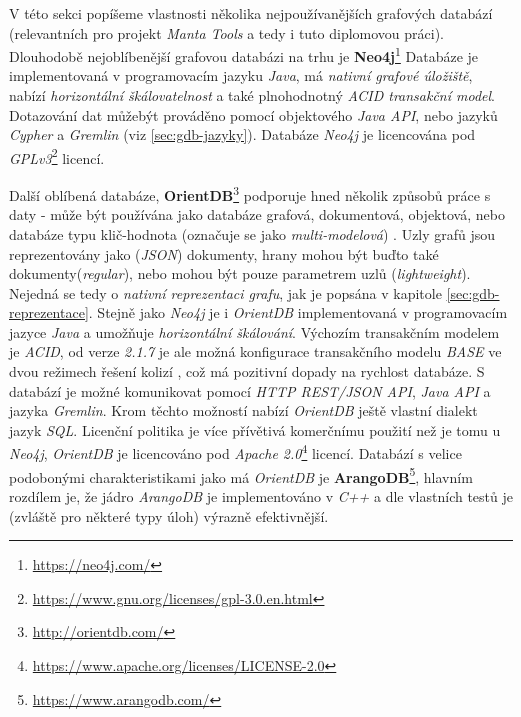 V této sekci popíšeme vlastnosti několika nejpoužívanějších grafových databází (relevantních pro projekt \textit{Manta Tools} a tedy i tuto diplomovou práci). Dlouhodobě nejoblíbenější grafovou databázi na trhu \cite{Ranking17} je \textbf{Neo4j}\footnote{\url{https://neo4j.com/}} Databáze je implementovaná v programovacím jazyku \textit{Java}, má \textit{nativní grafové úložiště}, nabízí \textit{horizontální škálovatelnost} a také plnohodnotný \textit{ACID transakční model}. Dotazování dat můžebýt prováděno pomocí objektového \textit{Java API}, nebo jazyků \textit{Cypher} a \textit{Gremlin} (viz \ref{sec:gdb-jazyky}).
Databáze \textit{Neo4j} je licencována pod \textit{GPLv3}\footnote{\url{https://www.gnu.org/licenses/gpl-3.0.en.html}} licencí.

Další oblíbená databáze, \textbf{OrientDB}\footnote{\url{http://orientdb.com/}} podporuje hned několik způsobů práce s daty - může být používána jako databáze grafová, dokumentová, objektová, nebo databáze typu klič-hodnota (označuje se jako \textit{multi-modelová}) \cite{OrientMultiModel}. Uzly grafů jsou reprezentovány jako (\textit{JSON}) dokumenty, hrany mohou být buďto také dokumenty(\textit{regular}), nebo mohou být pouze parametrem uzlů (\textit{lightweight}). Nejedná se tedy o \textit{nativní reprezentaci grafu}, jak je popsána v kapitole \ref{sec:gdb-reprezentace}.
Stejně jako \textit{Neo4j} je i \textit{OrientDB} implementovaná v programovacím jazyce \textit{Java} a umožňuje \textit{horizontální škálování}. Výchozím transakčním modelem je \textit{ACID}, od verze \textit{2.1.7} je ale možná konfigurace transakčního modelu \textit{BASE} ve dvou režimech řešení kolizí \cite{OrientConsistency}, což má pozitivní dopady na rychlost databáze. S databází je možné komunikovat pomocí \textit{HTTP REST/JSON API}, \textit{Java API} a jazyka \textit{Gremlin}. Krom těchto možností nabízí \textit{OrientDB} ještě vlastní dialekt jazyk \textit{SQL}. Licenční politika je více přívětivá komerčnímu použití než je tomu u \textit{Neo4j}, \textit{OrientDB} je licencováno pod \textit{Apache 2.0}\footnote{\url{https://www.apache.org/licenses/LICENSE-2.0}} licencí.
Databází s velice podobonými charakteristikami jako má \textit{OrientDB} je \textbf{ArangoDB}\footnote{\url{https://www.arangodb.com/}}, hlavním rozdílem je, že jádro \textit{ArangoDB} je implementováno v \textit{C++} a dle vlastních testů \cite{ArangoBenchmark} je (zvláště pro některé typy úloh) výrazně efektivnější.

